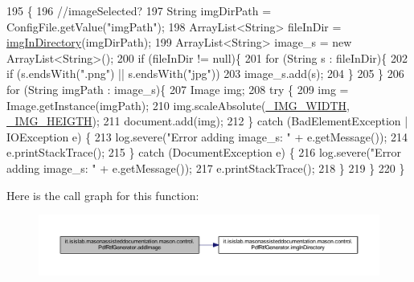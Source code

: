 \begin{DoxyCode}
195                                              \{
196         \textcolor{comment}{//imageSelected?}
197         String imgDirPath = ConfigFile.getValue(\textcolor{stringliteral}{"imgPath"});
198         ArrayList<String> fileInDir = \hyperlink{classit_1_1isislab_1_1masonassisteddocumentation_1_1mason_1_1control_1_1_pdf_rtf_generator_ac64a0fecc25dd00c58f569e111c06fe6}{imgInDirectory}(imgDirPath);
199         ArrayList<String> image\_s = \textcolor{keyword}{new} ArrayList<String>();
200         \textcolor{keywordflow}{if} (fileInDir != null)\{
201             \textcolor{keywordflow}{for} (String s : fileInDir)\{
202                 \textcolor{keywordflow}{if} (s.endsWith(\textcolor{stringliteral}{".png"}) || s.endsWith(\textcolor{stringliteral}{"jpg"}))
203                     image\_s.add(s);
204             \}
205         \}
206         \textcolor{keywordflow}{for} (String imgPath : image\_s)\{
207             Image img;
208             \textcolor{keywordflow}{try} \{
209                 img = Image.getInstance(imgPath);
210                 img.scaleAbsolute(\hyperlink{classit_1_1isislab_1_1masonassisteddocumentation_1_1mason_1_1control_1_1_pdf_rtf_generator_a6b1361e9b6de024b9aef76564ab8a6b1}{\_IMG\_WIDTH}, \hyperlink{classit_1_1isislab_1_1masonassisteddocumentation_1_1mason_1_1control_1_1_pdf_rtf_generator_a10a4f82a6bf2ff579193de7a28c84ac6}{\_IMG\_HEIGTH});
211                 document.add(img);
212             \} \textcolor{keywordflow}{catch} (BadElementException | IOException e) \{
213                 log.severe(\textcolor{stringliteral}{"Error adding image\_s: "} + e.getMessage());
214                 e.printStackTrace();
215             \} \textcolor{keywordflow}{catch} (DocumentException e) \{
216                 log.severe(\textcolor{stringliteral}{"Error adding image\_s: "} + e.getMessage());
217                 e.printStackTrace();
218             \}
219         \}
220     \}
\end{DoxyCode}


Here is the call graph for this function\-:
\nopagebreak
\begin{figure}[H]
\begin{center}
\leavevmode
\includegraphics[width=350pt]{classit_1_1isislab_1_1masonassisteddocumentation_1_1mason_1_1control_1_1_pdf_rtf_generator_a256d403130ef860861402da49b373042_cgraph}
\end{center}
\end{figure}




